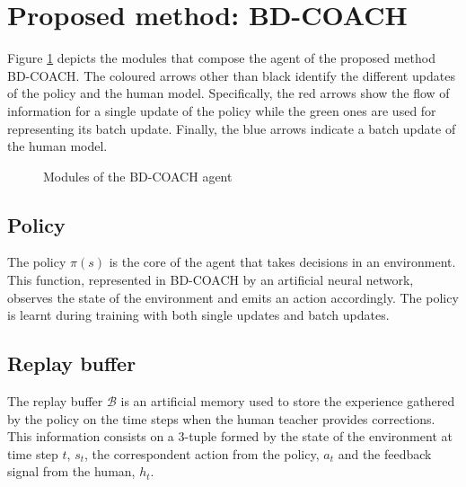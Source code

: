 \section{Proposed method: BD-COACH}
\label{section:Proposed method: BD-COACH}

Figure \ref{fig:BD-COACH} depicts the modules that compose the agent of the proposed method BD-COACH. The coloured arrows other than black identify the different updates of the policy and the human model. Specifically, the red arrows show the flow of information for a single update of the policy while the green ones are used for representing its batch update. Finally, the blue arrows indicate a batch update of the human model. 



\begin{figure}[H]
    \centering
    \caption{Modules of the BD-COACH agent}
    \label{fig:BD-COACH}
\end{figure}


\subsection*{Policy}

The policy $\pi(s)$ is the core of the agent that takes decisions in an environment. This function, represented in BD-COACH by an artificial neural network, observes the state of the environment and emits an action accordingly. The policy is learnt during training with both single updates and batch updates. 


\subsection*{Replay buffer}
The replay buffer $\mathcal{B}$ is an artificial memory  used to store the experience gathered by the policy on the time steps when the human teacher provides corrections. This information consists on a 3-tuple formed by the state of the environment at time step $t$,  $s_t$, the correspondent action from the policy, $a_t$ and the feedback signal from the human, $h_t$. 

